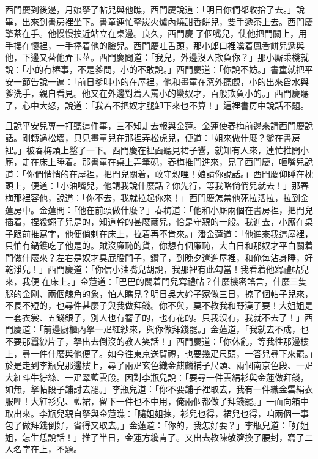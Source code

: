 西門慶到後邊，月娘拏了帖兒與他瞧，西門慶說道：「明日你們都收拾了去。」說畢，出來到書房裡坐下。書童連忙拏炭火爐內燒甜香餅兒，雙手遞茶上去。{}西門慶擎茶在手。他慢慢挨近站立在桌邊。{}良久，西門慶𢫓了個嘴兒，使他把門關上，用手摟在懷裡，一手捧着他的臉兒。西門慶吐舌頭，那小郎口裡噙着鳳香餅兒遞與他，下邊又替他弄玉莖。西門慶問道：「我兒，外邊沒人欺負你？」那小厮乘機就說：「小的有樁事，不是爹問，小的不敢說。」西門慶道：「你說不妨。」書童就把平安一節告說一遍：「前日爹叫小的在屋裡，他和畫童在窓外聽覷，小的出來舀水與爹洗手，親自看見。他又在外邊對着人罵小的蠻奴才，百般欺負小的。」西門慶聽了，心中大怒，說道：「我若不把奴才腿卸下來也不算！」這裡書房中說話不題。

且說平安兒專一打聽這件事，三不知走去報與金蓮。金蓮使春梅前邊來請西門慶說話。剛轉過松墻，只見畫童兒在那裡弄松虎兒，{}便道：「姐來做什麼？爹在書房裡。」被春梅頭上鑿了一下。西門慶在裡面聽見裙子響，就知有人來，連忙推開小厮，走在床上睡着。那書童在桌上弄筆硯，春梅推門進來，見了西門慶，咂嘴兒說道：「你們悄悄的在屋裡，把門兒關着，敢守親哩！娘請你說話。」西門慶仰睡在枕頭上，便道：「小油嘴兒，他請我說什麼話？你先行，等我略倘倘兒就去！」那春梅那裡容他，說道：「你不去，我就拉起你來！」西門慶怎禁他死拉活拉，拉到金蓮房中。金蓮問：「他在前頭做什麼？」春梅道：「他和小厮兩個在書房裡，把門兒插着，捏殺蠅子兒是的，知道幹的甚麼繭兒，恰是守親的一般。我進去，小厮在桌子跟前推寫字，他便倘剌在床上，拉着再不肯來。」潘金蓮道：「他進來我這屋裡，只怕有鍋鑊吃了他是的。{}賊沒廉恥的貨，你想有個廉恥，大白日和那奴才平白關着門做什麼來？左右是奴才臭屁股門子，鑽了，到晚夕還進屋裡，和俺每沾身睡，好乾淨兒！」{}西門慶道：「你信小油嘴兒胡說，我那裡有此勾當！我看着他寫禮帖兒來，我便𢱉在床上。」金蓮道：「巴巴的關着門兒寫禮帖？什麼機密謠言，什麼三隻腿的金剛、兩個觫角的象，{}怕人瞧見？明日吳大妗子家做三日，掠了個帖子兒來，不長不短的，也尋件甚麼子與我做拜錢。你不與，莫不教我和野漢子要！大姐姐是一套衣裳、五錢銀子，別人也有簪子的，也有花的。只我沒有，我就不去了！」西門慶道：「前邊廚櫃內拏一疋紅紗來，與你做拜錢罷。」金蓮道，「我就去不成，也不要那囂紗片子，拏出去倒沒的教人笑話！」西門慶道：「你休亂，等我徃那邊樓上，尋一件什麼與他便了。如今徃東京送賀禮，也要幾疋尺頭，一答兒尋下來罷。」於是走到李瓶兒那邊樓上，尋了兩疋玄色織金麒麟補子尺頭、兩個南京色段、一疋大紅斗牛紵絲、一疋翠藍雲段。因對李瓶兒說：「要尋一件雲絹衫與金蓮做拜錢，如無，拏帖段子鋪討去罷。」李瓶兒道：「你不要鋪子裡取去，我有一件織金雲絹衣服哩！大紅衫兒、藍裙，留下一件也不中用，俺兩個都做了拜錢罷。」一面向箱中取出來。李瓶兒親自拏與金蓮瞧：「隨姐姐揀，衫兒也得，裙兒也得，咱兩個一事包了做拜錢倒好，省得又取去。」金蓮道：「你的，我怎好要？」李瓶兒道：「好姐姐，怎生恁說話！」推了半日，金蓮方纔肯了。又出去教陳敬濟換了腰封，寫了二人名字在上，不題。

